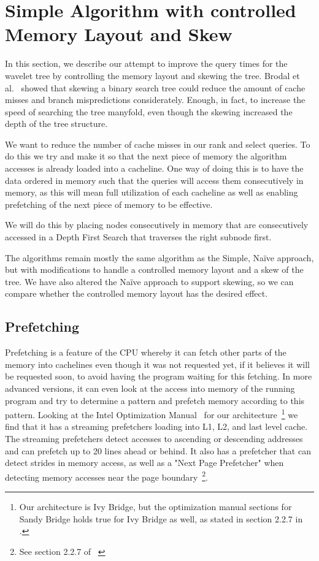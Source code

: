 \section{Simple Algorithm with controlled Memory Layout and Skew}
\label{sec:memorylayout}
In this section, we describe our attempt to improve the query times for the wavelet tree by controlling the memory layout and skewing the tree.
Brodal et al.~\cite{gerthSkewedBinarySearchTrees} showed that skewing a binary search tree could reduce the amount of cache misses and branch mispredictions considerately. Enough, in fact, to increase the speed of searching the tree manyfold, even though the skewing increased the depth of the tree structure.

We want to reduce the number of cache misses in our rank and select queries.
To do this we try and make it so that the next piece of memory the algorithm accesses is already loaded into a cacheline.
One way of doing this is to have the data ordered in memory such that the queries will access them consecutively in memory, as this will mean full utilization of each cacheline as well as enabling prefetching of the next piece of memory to be effective.

We will do this by placing nodes consecutively in memory that are consecutively accessed in a Depth First Search that traverses the right subnode first.

The algorithms remain mostly the same algorithm as the Simple, Naïve approach, but with modifications to handle a controlled memory layout and a skew of the tree.
We have also altered the Naïve approach to support skewing, so we can compare whether the controlled memory layout has the desired effect.

\subsection{Prefetching}
Prefetching is a feature of the CPU whereby it can fetch other parts of the memory into cachelines even though it was not requested yet, if it believes it will be requested soon, to avoid having the program waiting for this fetching.
In more advanced versions, it can even look at the access into memory of the running program and try to determine a pattern and prefetch memory according to this pattern.
Looking at the Intel Optimization Manual~\cite{intel-optimization-manual} for our architecture~\footnote{Our architecture is Ivy Bridge, but the optimization manual sections for Sandy Bridge holds true for Ivy Bridge as well, as stated in section 2.2.7 in \cite{intel-optimization-manual}.} we find that it has a streaming prefetchers loading into L1, L2, and last level cache. The streaming prefetchers detect accesses to ascending or descending addresses and can prefetch up to 20 lines ahead or behind. It also has a prefetcher that can detect strides in memory access, as well as a "Next Page Prefetcher" when detecting memory accesses near the page boundary~\footnote{See section 2.2.7 of ~\cite{intel-optimization-manual}}.


